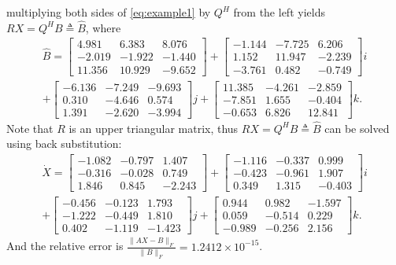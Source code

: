 \documentclass[12pt]{article}
\numberwithin{equation}{section} %
\begin{document}
multiplying both sides of \eqref{eq:example1} by \(Q^H\) from the left yields \(RX = Q^HB\triangleq\hat{B}\),
where
\begin{align*}
\hat{B} =
\begin{bmatrix}
4.981 & 6.383 & 8.076 \\
-2.019 & -1.922 & -1.440 \\
11.356 & 10.929 & -9.652
\end{bmatrix} +
\begin{bmatrix}
-1.144 & -7.725 & 6.206 \\
1.152 & 11.947 & -2.239 \\
-3.761 & 0.482 & -0.749
\end{bmatrix} i \\+
\begin{bmatrix}
-6.136 & -7.249 & -9.693 \\
0.310 & -4.646 & 0.574 \\
1.391 & -2.620 & -3.994
\end{bmatrix} j +
\begin{bmatrix}
11.385 & -4.261 & -2.859 \\
-7.851 & 1.655 & -0.404 \\
-0.653 & 6.826 & 12.841
\end{bmatrix} k.
\end{align*}
Note that \(R\) is an upper triangular matrix, thus   \(RX = Q^HB\triangleq\hat{B}\)  can be solved using back substitution:
 \begin{align*}
\dot{X} =
\begin{bmatrix}
-1.082 & -0.797 & 1.407 \\
-0.316 & -0.028 & 0.749 \\
1.846 & 0.845 & -2.243
\end{bmatrix} +
\begin{bmatrix}
-1.116 & -0.337 & 0.999 \\
-0.423 & -0.961 & 1.907 \\
0.349 & 1.315 & -0.403
\end{bmatrix} i \\+
\begin{bmatrix}
-0.456 & -0.123 & 1.793 \\
-1.222 & -0.449 & 1.810 \\
0.402 & -1.119 & -1.423
\end{bmatrix} j +
\begin{bmatrix}
0.944 & 0.982 & -1.597 \\
0.059 & -0.514 & 0.229 \\
-0.989 & -0.256 & 2.156
\end{bmatrix} k.
\end{align*}
And the relative error is $\frac{\|AX - B\|_F}{\|B\|_F} = 1.2412\times 10^{-15}$.

\iffalse
\end{document}
